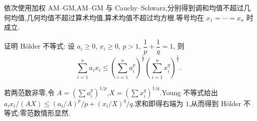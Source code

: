 \begin{solution}
    依次使用加权 AM--GM,AM--GM 与 Cauchy--Schwarz,分别得到调和均值不超过几何均值,几何均值不超过算术均值,算术均值不超过均方根.等号均在 $x_1=\cdots=x_n$ 时成立.
\end{solution}

\begin{example}[\markstar]
    证明 H\"older 不等式: 设 $a_i\geq0$, $x_i\geq0$, $p>1$, $\dfrac{1}{p}+\dfrac{1}{q}=1$, 则
    \[
        \displaystyle\sum\limits_{i=1}^na_ix_i
        \leq\left(\sum\limits_{i=1}^na_i^p\right)^{\frac{1}{p}}
        \left(\sum\limits_{i=1}^nx_i^q\right)^{\frac{1}{q}}.
    \]
\end{example}
\exampleblank

\begin{solution}
    若两范数非零,令 $A=(\displaystyle\sum a_i^p)^{1/p}$,$X=(\displaystyle\sum x_i^q)^{1/q}$.Young 不等式给出
    $a_ix_i/(AX)\leq (a_i/A)^p/p+(x_i/X)^q/q$.求和即得右端为 $1$,从而得到 H\"older 不等式;零范数情形显然.
\end{solution}
